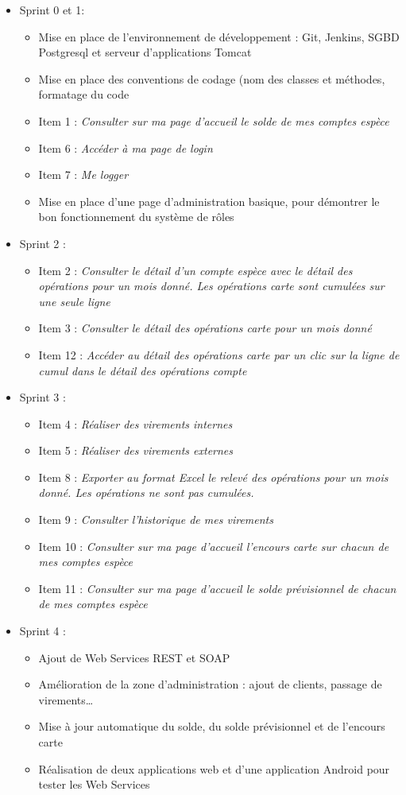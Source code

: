 \begin{itemize}
	\item Sprint 0 et 1:
	\begin{itemize}
		\item Mise en place de l'environnement de développement : Git, Jenkins, SGBD Postgresql et serveur d'applications Tomcat
		\item Mise en place des conventions de codage (nom des classes et méthodes, formatage du code
		 \item Item 1 : \textit{Consulter sur ma page d’accueil le solde de mes comptes espèce}
		 \item Item 6 : \textit{Accéder à ma page de login}
		 \item Item 7 : \textit{Me logger}
		 \item Mise en place d'une page d'administration basique, pour démontrer le bon fonctionnement du système de rôles 
	\end{itemize}
	\item Sprint 2 :
	\begin{itemize}
		\item Item 2 : \textit{Consulter le détail d'un compte espèce avec le détail des opérations pour un mois donné. Les opérations carte sont cumulées sur une seule ligne}
		\item Item 3 : \textit{Consulter le détail des opérations carte pour un mois donné}
		\item Item 12 : \textit{Accéder au détail des opérations carte par un clic sur la ligne de cumul dans le détail des opérations compte}
	\end{itemize}
	\item Sprint 3 : 
	\begin{itemize}
		\item Item 4 : \textit{Réaliser des virements internes}
		\item Item 5 : \textit{Réaliser des virements externes}
		\item Item 8 : \textit{Exporter au format Excel le relevé des opérations pour un mois donné. Les opérations ne sont pas cumulées.}
		\item Item 9 : \textit{Consulter l'historique de mes virements}
		\item Item 10 : \textit{Consulter sur ma page d'accueil l'encours carte sur chacun de mes comptes espèce}
		\item Item 11 : \textit{Consulter sur ma page d'accueil le solde prévisionnel de chacun de mes comptes espèce}
	\end{itemize}
	\item Sprint 4 :
	\begin{itemize}
		\item Ajout de Web Services REST et SOAP
		\item Amélioration de la zone d'administration : ajout de clients, passage de virements\ldots
		\item Mise à jour automatique du solde, du solde prévisionnel et de l'encours carte
		\item Réalisation de deux applications web et d'une application Android pour tester les Web Services
	\end{itemize}
\end{itemize}

